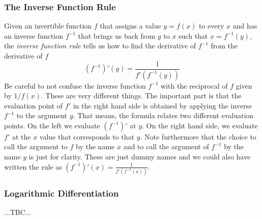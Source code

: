 

\subsubsection{The Inverse Function Rule}
Given an invertible function $f$ that assigns a value $y = f(x)$ to every $x$ and has an inverse function  $f^{-1}$ that brings us back from $y$ to $x$ such that $x = f^{-1}(y)$, the \emph{inverse function rule} tells us how to find the derivative of  $f^{-1}$ from the derivative of $f$
\begin{equation}
 (f^{-1})'(y) = \frac{1}{f'(f^{-1}(y))}
\end{equation}
Be careful to not confuse the inverse function $f^{-1}$ with the reciprocal of $f$ given by $1/f(x)$. These are very different things. The important part is that the evaluation point of $f'$ in the right hand side is obtained by applying the inverse $f^{-1}$ to the argument $y$. That means, the formula relates two different evaluation points. On the left we evaluate $(f^{-1})'$ at $y$. On the right hand side, we evaluate $f'$ at the $x$ value that corresponds to that $y$. Note furthermore that the choice to call the argument to $f$ by the name $x$ and to call the argument of $f^{-1}$ by the name $y$ is just for clarity. These are just dummy names and we could also have written the rule as $(f^{-1})'(x) = \frac{1}{f'(f^{-1}(x))}$. 






\subsubsection{Logarithmic Differentiation} ...TBC...






